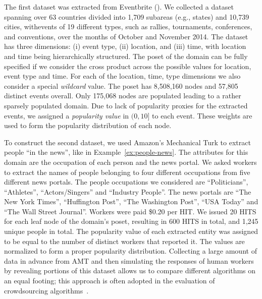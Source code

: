 The first dataset was extracted from Eventbrite (). We collected a dataset spanning \iftr over 63 countries divided into 1,709 subareas (e.g., states) and 10,739 cities, with\fi events of 19 different types, such as rallies, tournaments, conferences, and conventions, over the months of October and November 2014. The dataset has three dimensions: (i) event type, (ii) location, and (iii) time, with location and time being hierarchically structured. The poset of the domain can be fully specified if we consider the cross product across the possible values for location, event type and time. For each of the location, time, type dimensions we also consider a special {\em wildcard} value. The poset has 8,508,160 nodes and 57,805 distinct events overall. Only 175,068 nodes are populated leading to a rather sparsely populated domain. Due to lack of popularity proxies for the extracted events, we assigned a {\em popularity value} in $(0,10]$ to each event. \iftr These weights are used to form the popularity distribution of each node.\fi 

To construct the second dataset, we used Amazon's Mechanical Turk to extract people ``in the news'', like in Example~\ref{ex:people-news}.
\iftr The attributes for this domain are the occupation of each person and the news portal. 
\fi We asked workers to extract the names of people belonging to four different occupations from five different news portals.
\iftr The people occupations we considered are ``Politicians'', ``Athletes'', ``Actors/Singers'' and ``Industry People''. The news portals are ``The New York Times'', ``Huffington Post'', ``The Washington Post'', ``USA  Today'' and ``The Wall Street Journal''. 
Workers were paid \$0.20 per HIT. 
\fi We issued 20 HITS for each leaf node of the domain's poset, resulting in 600 HITS in total, and 1,245 unique people in total.
The popularity value of each extracted entity was assigned to be equal to the number of distinct workers that reported it. 
\iftr The values are normalized to form a proper popularity distribution.  Collecting a large amount of data in advance from AMT and then simulating the responses of human workers by revealing portions of this dataset allows us to compare different algorithms on an equal footing; this approach is often adopted in the evaluation of crowdsourcing algorithms~\cite{marcus:2011, DBLP:journals/pvldb/ParameswaranBG0PW14,trushkowsky:2013}.
\fi

